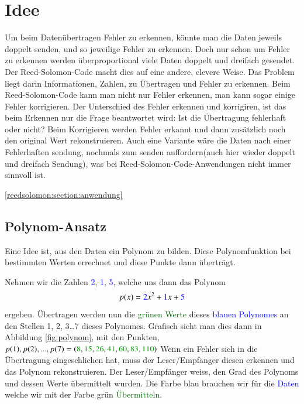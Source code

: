 %
%
%
\section{Idee
\label{reedsolomon:section:idee}}
Um beim Datenübertragen Fehler zu erkennen, könnte man die Daten jeweils doppelt senden,
und so jeweilige Fehler zu erkennen.
Doch nur schon um Fehler zu erkennen werden überproportional viele Daten doppelt und dreifach gesendet.
Der Reed-Solomon-Code macht dies auf eine andere, clevere Weise.
Das Problem liegt darin Informationen, Zahlen, 
zu Übertragen und Fehler zu erkennen.
Beim Reed-Solomon-Code kann man nicht nur Fehler erkennen, 
man kann sogar einige Fehler korrigieren.
Der Unterschied des Fehler erkennen und korrigiren, ist das beim Erkennen nur die Frage beantwortet wird: Ist die Übertragung fehlerhaft oder nicht?
Beim Korrigieren werden Fehler erkannt und dann zusätzlich noch den original Wert rekonstruieren.
Auch eine Variante wäre die Daten nach einer Fehlerhaften sendung, nochmals zum senden auffordern(auch hier wieder doppelt und dreifach Sendung), 
was bei Reed-Solomon-Code-Anwendungen nicht immer sinnvoll ist. 

\ref{reedsolomon:section:anwendung}

\subsection{Polynom-Ansatz
\label{reedsolomon:section:polynomansatz}}
Eine Idee ist, aus den Daten ein Polynom zu bilden.
Diese Polynomfunktion bei bestimmten Werten errechnet und diese Punkte dann überträgt.
\begin{beispiel} Nehmen wir die Zahlen \textcolor{blue}{2}, \textcolor{blue}{1}, \textcolor{blue}{5},
welche uns dann das Polynom 
\begin{equation}
p(x)
=
\textcolor{blue}{2}x^2 + \textcolor{blue}{1}x + \textcolor{blue}{5}
\label{reedsolomon:equation1}
\end{equation}
ergeben.
Übertragen werden nun die \textcolor{darkgreen}{grünen Werte} 
dieses \textcolor{blue}{blauen Polynomes} an den Stellen 1, 2, 3\dots 7 dieses Polynomes.
Grafisch sieht man dies dann in Abbildung \ref{fig:polynom}, 
mit den Punkten, $p(1),p(2),...,p(7) = (\textcolor{darkgreen}{8}, 
\textcolor{darkgreen}{15}, \textcolor{darkgreen}{26},
\textcolor{darkgreen}{41}, \textcolor{darkgreen}{60}, 
\textcolor{darkgreen}{83}, \textcolor{darkgreen}{110})$
Wenn ein Fehler sich in die Übertragung eingeschlichen hat, muss der Leser/Empfänger diesen erkennen und das Polynom rekonstruieren.
Der Leser/Empfänger weiss, den Grad des Polynoms und dessen Werte übermittelt wurden. 
Die Farbe blau brauchen wir für die \textcolor{blue}{Daten} welche wir mit der Farbe grün \textcolor{darkgreen}{Übermitteln}.
\end{beispiel}

